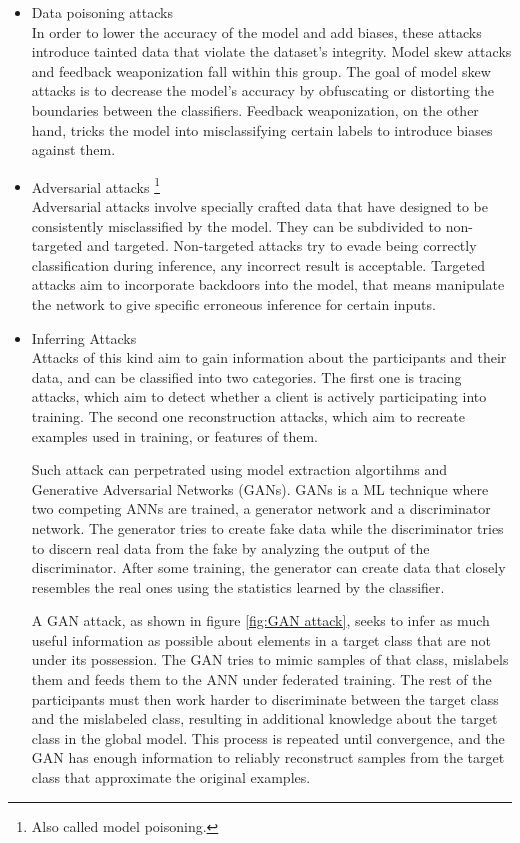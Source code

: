\begin{itemize}
  \item Data poisoning attacks\\
  In order to lower the accuracy of the model and add biases, these attacks introduce tainted data that violate the dataset's integrity. Model skew attacks \cite{Model_skewing_attacks} and feedback weaponization\cite{feedback_weaponization} fall within this group. The goal of model skew attacks is to decrease the model's accuracy by obfuscating or distorting the boundaries between the classifiers. Feedback weaponization, on the other hand, tricks the model into misclassifying certain labels to introduce biases against them.
  
  \item Adversarial attacks \footnote{Also called model poisoning.}\\
  Adversarial attacks \cite{adversarial_attack} involve specially crafted data that have designed to be consistently misclassified by the model. They can be subdivided to non-targeted and targeted. Non-targeted attacks try to evade being correctly classification during inference, any incorrect result is acceptable. Targeted attacks aim to incorporate backdoors into the model, that means manipulate the network to give specific erroneous inference for certain inputs.
  
  \item Inferring Attacks\\
  Attacks of this kind aim to gain information about the participants and their data, and can be classified into two categories. The first one is tracing attacks, which aim to detect whether a client is actively participating into training. The second one reconstruction attacks, which aim to recreate examples used in training, or features of them.
  
  Such attack can perpetrated using model extraction algortihms and Generative Adversarial Networks \cite{GAN_attack} (GANs). GANs is a ML technique where two competing ANNs are trained, a generator network and a discriminator network. The generator tries to create fake data while the discriminator tries to discern real data from the fake by analyzing the output of the discriminator. After some training, the generator can create data that closely resembles the real ones using the statistics learned by the classifier.
  
  A GAN attack, as shown in figure \ref{fig:GAN attack}, seeks to infer as much useful information as possible about elements in a target class that are not under its possession. The GAN tries to mimic samples of that class, mislabels them and feeds them to the ANN under federated training. The rest of the participants must then work harder to discriminate between the target class and the mislabeled class, resulting in additional knowledge about the target class in the global model. This process is repeated until convergence, and the GAN has enough information to reliably reconstruct samples from the target class that approximate the original examples. 
  

\end{itemize}
